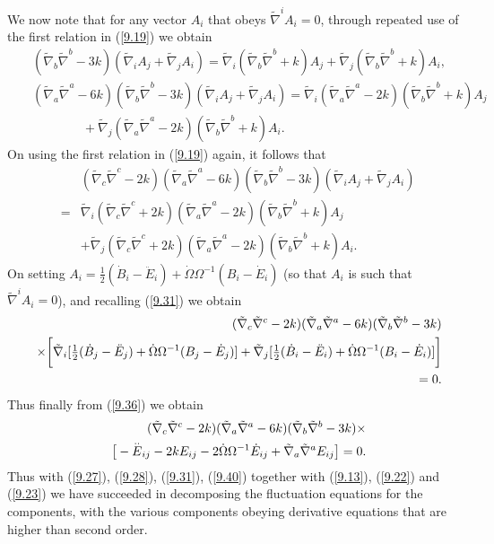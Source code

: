 %
We now note that for any vector $A_i$ that obeys $\tilde{\nabla}^iA_i=0$, through repeated use of the first relation in (\ref{9.19}) we obtain 
%
\begin{eqnarray}
&&(\tilde{\nabla}_b\tilde{\nabla}^b-3k)(\tilde{\nabla}_iA_j+\tilde{\nabla}_jA_i)=
\tilde{\nabla}_i(\tilde{\nabla}_b\tilde{\nabla}^b+k)A_j+
\tilde{\nabla}_j(\tilde{\nabla}_b\tilde{\nabla}^b+k)A_i,
\nonumber\\
&&(\tilde{\nabla}_a\tilde{\nabla}^a-6k)(\tilde{\nabla}_b\tilde{\nabla}^b-3k)(\tilde{\nabla}_iA_j+\tilde{\nabla}_jA_i)
=\tilde{\nabla}_i(\tilde{\nabla}_a\tilde{\nabla}^a-2k)(\tilde{\nabla}_b\tilde{\nabla}^b+k)A_j
\nonumber\\
&&\qquad\qquad+
\tilde{\nabla}_j(\tilde{\nabla}_a\tilde{\nabla}^a-2k)(\tilde{\nabla}_b\tilde{\nabla}^b+k)A_i.
\label{9.37}
\end{eqnarray}
%
On using the first relation in (\ref{9.19}) again,  it follows that 
%
\begin{eqnarray}
&&(\tilde{\nabla}_c\tilde{\nabla}^c-2k)(\tilde{\nabla}_a\tilde{\nabla}^a-6k)(\tilde{\nabla}_b\tilde{\nabla}^b-3k)(\tilde{\nabla}_iA_j+\tilde{\nabla}_jA_i)
\nonumber\\
&=&\tilde{\nabla}_i(\tilde{\nabla}_c\tilde{\nabla}^c+2k)(\tilde{\nabla}_a\tilde{\nabla}^a-2k)(\tilde{\nabla}_b\tilde{\nabla}^b+k)A_j
\nonumber\\
&&+
\tilde{\nabla}_j(\tilde{\nabla}_c\tilde{\nabla}^c+2k)(\tilde{\nabla}_a\tilde{\nabla}^a-2k)(\tilde{\nabla}_b\tilde{\nabla}^b+k)A_i.
\label{9.38}
\end{eqnarray}
%
On setting $A_i=\tfrac{1}{2}(\dot{B}_i-\ddot{E}_i)+\dot{\Omega}\Omega^{-1}(B_i-\dot{E}_i)$ (so that $A_i$ is such that $\tilde{\nabla}^iA_i=0$), and recalling (\ref{9.31}) we obtain
%
\begin{eqnarray}
&&(\tilde{\nabla}_c\tilde{\nabla}^c-2k)(\tilde{\nabla}_a\tilde{\nabla}^a-6k)(\tilde{\nabla}_b\tilde{\nabla}^b-3k)
\nonumber\\
&&\times\bigg{[}
\tilde{\nabla}_i[\tfrac{1}{2}(\dot{B}_j-\ddot{E}_j)+\dot{\Omega}\Omega^{-1}(B_j-\dot{E}_j)]+\tilde{\nabla}_j[\tfrac{1}{2}(\dot{B}_i-\ddot{E}_i)+\dot{\Omega}\Omega^{-1}(B_i-\dot{E}_i)]\bigg{]}\nonumber\\
&&=0.
\label{9.39}
\end{eqnarray}
%
Thus finally from (\ref{9.36}) we obtain
%
\begin{eqnarray}
&&(\tilde{\nabla}_c\tilde{\nabla}^c-2k)(\tilde{\nabla}_a\tilde{\nabla}^a-6k)(\tilde{\nabla}_b\tilde{\nabla}^b-3k)\times
\nonumber\\
&&
\big{[}
- \overset{..}{E}_{ij} - 2 k E_{ij} - 2  \dot{\Omega} \Omega^{-1}\dot{E}_{ij} + \tilde{\nabla}_{a}\tilde{\nabla}^{a}E_{ij}\big{]}=0.
\label{9.40}
\end{eqnarray}
%
Thus with (\ref{9.27}), (\ref{9.28}), (\ref{9.31}), (\ref{9.40}) together with (\ref{9.13}), (\ref{9.22}) and (\ref{9.23}) we have succeeded in decomposing the fluctuation equations for the components, with the various components obeying derivative equations that are higher than second order.


